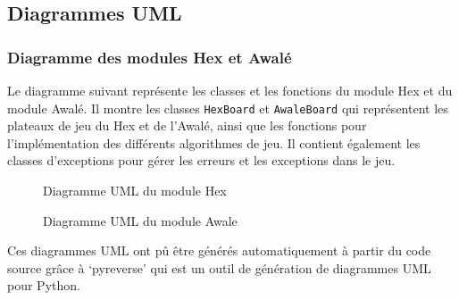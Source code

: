 \subsection{Diagrammes UML}

\subsubsection{Diagramme des modules Hex et Awalé}

Le diagramme suivant représente les classes et les fonctions du module Hex et du module Awalé.
Il montre les classes \texttt{HexBoard} et \texttt{AwaleBoard} qui représentent les plateaux de jeu
du Hex et de l'Awalé, ainsi que les fonctions pour l'implémentation des différents algorithmes de jeu.
Il contient également les classes d'exceptions pour gérer les erreurs et les exceptions dans le jeu.

\begin{figure}[!htb]
    \centering
    \caption{Diagramme UML du module Hex}\label{Fig:UML_hex}
\end{figure}
\begin{figure}[!htb]
    \centering
    \caption{Diagramme UML du module Awale}\label{Fig:UML_awale}
\end{figure}

Ces diagrammes UML ont pû être générés automatiquement à partir du code source grâce à 
`pyreverse' qui est un outil de génération de diagrammes UML pour Python.

